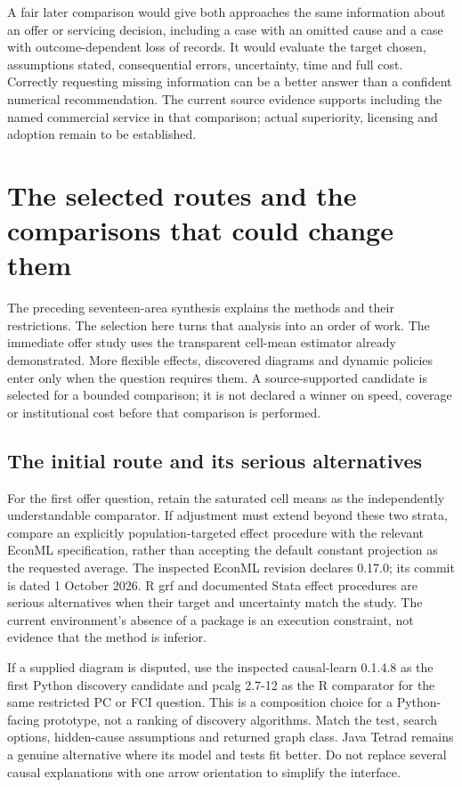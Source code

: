 A fair later comparison would give both approaches the same information about
an offer or servicing decision, including a case with an omitted cause and a
case with outcome-dependent loss of records. It would evaluate the target
chosen, assumptions stated, consequential errors, uncertainty, time and full
cost. Correctly requesting missing information can be a better answer than a
confident numerical recommendation. The current source evidence supports
including the named commercial service in that comparison; actual superiority,
licensing and adoption remain to be established.


\section{The selected routes and the comparisons that could change them}
\label{rewrite:software-selection}

The preceding seventeen-area synthesis explains the methods and their
restrictions. The selection here turns that analysis into an order of work.
The immediate offer study uses the transparent cell-mean estimator already
demonstrated. More flexible effects, discovered diagrams and dynamic policies
enter only when the question requires them. A source-supported candidate is
selected for a bounded comparison; it is not declared a winner on speed,
coverage or institutional cost before that comparison is performed.

\subsection{The initial route and its serious alternatives}
For the first offer question, retain the saturated cell means as the
independently understandable comparator. If adjustment must extend beyond
these two strata, compare an explicitly population-targeted effect procedure
with the relevant EconML specification, rather than accepting the default
constant projection as the requested average. The inspected EconML revision
declares 0.17.0; its commit is dated 1 October 2026. R grf and documented
Stata effect procedures are serious alternatives when their target and
uncertainty match the study. The current environment's absence of a package
is an execution constraint, not evidence that the method is inferior.
\citep{exec19_econml_source,exec13_grf_rpath,exec13_ch_stata}

If a supplied diagram is disputed, use the inspected causal-learn 0.1.4.8
as the first Python discovery candidate and pcalg 2.7-12 as the R comparator
for the same restricted PC or FCI question. This is a composition choice
for a Python-facing prototype, not a ranking of discovery algorithms.
Match the test, search options, hidden-cause assumptions and returned graph
class. Java Tetrad remains a genuine alternative where its model and tests
fit better. Do not replace several causal explanations with one arrow
orientation to simplify the interface.
\citep{v12_sw_causallearn,exec13_pcalg_reuse_primary,exec13_java_tetrad}


